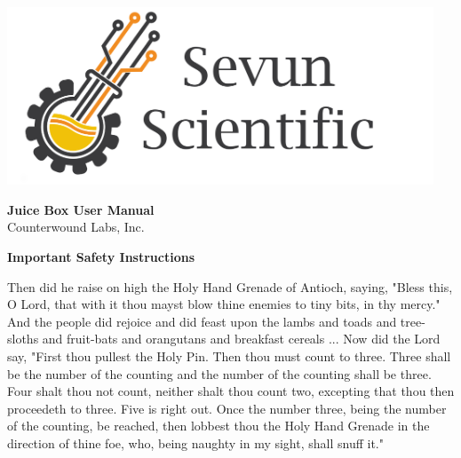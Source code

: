 \documentclass[10pt]{article}
\begin{document}
\date{\today} %
\begin{titlingpage} %
	\centering %
	\includegraphics[width=5in]{ssi_logo.png}
	\vspace{2cm}
\begin{flushleft} %
	\begin{Huge}
		\textbf{Juice Box User Manual}\\
		\vspace{5mm}
		Counterwound Labs, Inc.
	\end{Huge}
\end{flushleft}
\vfill
{\Large \thedate \par}
\end{titlingpage} 

\begin{flushleft}
	{\huge \textbf{Important Safety Instructions} \par}
	\vspace{1cm}

	\leftskip=3cm
	\begin{large} 
		Then did he raise on high the Holy Hand Grenade of Antioch, saying, 
		"Bless this, O Lord, that with it thou mayst blow thine enemies to tiny 
		bits, in thy mercy." And the people did rejoice and did feast upon the 
		lambs and toads and tree-sloths and fruit-bats and orangutans and 
		breakfast cereals ... Now did the Lord say, "First thou pullest the Holy 
		Pin. Then thou must count to three. Three shall be the number of the 
		counting and the number of the counting shall be three. Four shalt 
		thou not count, neither shalt thou count two, excepting that thou then 
		proceedeth to three. Five is right out. Once the number three, being the 
		number of the counting, be reached, then lobbest thou the Holy Hand 
		Grenade in the direction of thine foe, who, being naughty in my sight, 
		shall snuff it."
	\end{large}
\end{flushleft}
\end{document}
